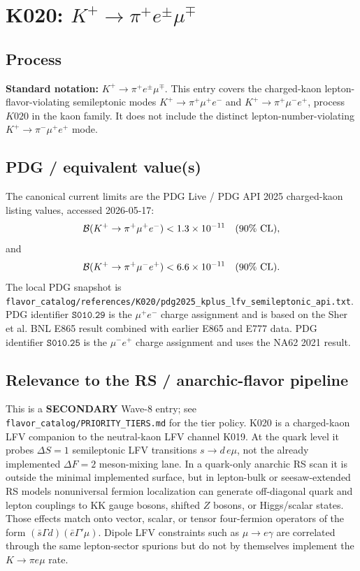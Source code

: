 
\section{K020: \(K^+ \to \pi^+ e^{\pm}\mu^{\mp}\)}

\subsection*{Process}
\textbf{Standard notation:} \(K^+ \to \pi^+ e^{\pm}\mu^{\mp}\).  This entry
covers the charged-kaon lepton-flavor-violating semileptonic modes
\(K^+\to\pi^+\mu^+ e^-\) and \(K^+\to\pi^+\mu^- e^+\), process \(K020\) in
the kaon family.  It does not include the distinct lepton-number-violating
\(K^+\to\pi^-\mu^+e^+\) mode.

\subsection*{PDG / equivalent value(s)}
The canonical current limits are the PDG Live / PDG API 2025 charged-kaon
listing values, accessed 2026-05-17:
\[
  {\cal B}(K^+\to\pi^+\mu^+e^-) < 1.3\times10^{-11}\quad(90\%\ {\rm CL}),
\]
and
\[
  {\cal B}(K^+\to\pi^+\mu^-e^+) < 6.6\times10^{-11}\quad(90\%\ {\rm CL}).
\]
The local PDG snapshot is
\texttt{flavor\_catalog/references/K020/pdg2025\_kplus\_lfv\_semileptonic\_api.txt}.
PDG identifier \(\texttt{S010.29}\) is the \(\mu^+e^-\) charge assignment and
is based on the Sher et al. BNL E865 result combined with earlier E865 and
E777 data.  PDG identifier \(\texttt{S010.25}\) is the \(\mu^-e^+\) charge
assignment and uses the NA62 2021 result.

\subsection*{Relevance to the RS / anarchic-flavor pipeline}
This is a \textbf{SECONDARY} Wave-8 entry; see
\texttt{flavor\_catalog/PRIORITY\_TIERS.md} for the tier policy.  K020 is a
charged-kaon LFV companion to the neutral-kaon LFV channel K019.  At
the quark level it probes \(\Delta S=1\) semileptonic LFV transitions
\(s\to d\,e\mu\), not the already implemented \(\Delta F=2\) meson-mixing
lane.  In a quark-only anarchic RS scan it is outside the minimal implemented
surface, but in lepton-bulk or seesaw-extended RS models nonuniversal fermion
localization can generate off-diagonal quark and lepton couplings to KK gauge
bosons, shifted \(Z\) bosons, or Higgs/scalar states.  Those effects match onto
vector, scalar, or tensor four-fermion operators of the form
\((\bar s\Gamma d)(\bar e\Gamma'\mu)\).  Dipole LFV constraints such as
\(\mu\to e\gamma\) are correlated through the same lepton-sector spurions but
do not by themselves implement the \(K\to\pi e\mu\) rate.

